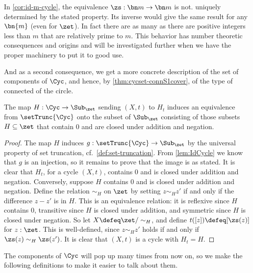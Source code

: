 \begin{remark}\label{rem:thenonuniquenessofgeneratorsofmodulararithmetic1}
  In \cref{cor:id-m-cycle}, the equivalence $\zs:\bn m\to\bn m$ is not.
  uniquely determined by the stated property. Its inverse would give the
  same result for any $\bn{m}$ (even for $\zet$). In fact there are
  as many as there are positive integers less than
  $m$ that are relatively prime to $m$.  This behavior has number theoretic
  consequences and origins and will be investigated further when we
  have the proper machinery to put it to good use.
\end{remark}

And as a second consequence,
we get a more concrete description of the set of components of $\Cyc$,
and hence, by \cref{thm:cycset-connS1cover},
of the type of connected \coverings of the circle.
\begin{corollary}\label{cor:set-trunc-cyc}
  The map $H : \Cyc \to \Sub_\zet$ sending $(X,t)$ to $H_t$
  induces an equivalence from $\setTrunc{\Cyc}$
  onto the subset of $\Sub_\zet$ consisting of those subsets
  $H \subseteq \zet$ that contain $0$ and are closed under addition and negation.
\end{corollary}
\begin{proof}
  The map $H$ induces $g : \setTrunc{\Cyc} \to \Sub_\zet$
  by the universal property of set truncation, cf.~\cref{def:set-truncation}.
  From \cref{lem:IdCycle} we know that $g$ is an injection,
  so it remains to prove that the image is as stated.
  It is clear that $H_t$, for a cycle $(X,t)$, contains $0$ and is closed
  under addition and negation.
  Conversely, suppose $H$ contains $0$ and is closed under addition and negation.
  Define the relation $\sim_H$ on $\zet$ by setting $z \sim_H z'$ if and only if
  the difference $z-z'$ is in $H$.
  This is an equivalence relation:
  it is reflexive since $H$ contains $0$,
  transitive since $H$ is closed under addition,
  and symmetric since $H$ is closed under negation.
  So let $X \defeq \zet/\sim_H$, and define $t([z])\defeq[\zs(z)]$
  for $z:\zet$.
  This is well-defined, since $z \sim_H z'$ holds if and only if
  $\zs(z) \sim_H \zs(z')$.
  It is clear that $(X,t)$ is a cycle with $H_t = H$.
\end{proof}
The components of $\Cyc$ will pop up many times from now on,
so we make the following definitions to make it easier to talk about them.
